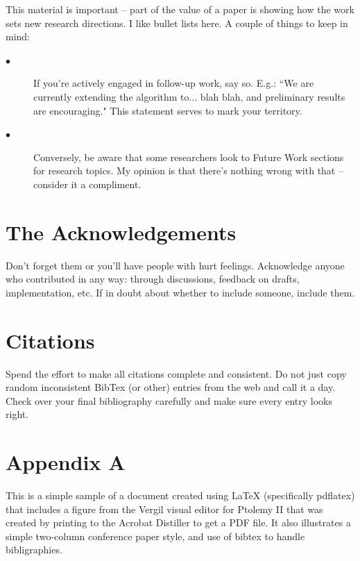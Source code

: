 \documentclass[10pt,twocolumn]{article}
\begin{document}
This material is important -- part of the value of a paper is showing how the work sets new research directions. I like bullet lists here. A couple of things to keep in mind:
\begin{description}
  \item[$\bullet$]  If you're actively engaged in follow-up work, say so. E.g.: ``We are currently extending the algorithm to... blah blah, and preliminary results are encouraging." This statement serves to mark your territory.
\item[$\bullet$]  Conversely, be aware that some researchers look to Future Work sections for research topics. My opinion is that there's nothing wrong with that -- consider it a compliment.
\end{description}

\section{The Acknowledgements}

Don't forget them or you'll have people with hurt feelings. Acknowledge anyone who contributed in any way: through discussions, feedback on drafts, implementation, etc. If in doubt about whether to include someone, include them.


\section{Citations}

Spend the effort to make all citations complete and consistent. Do not just copy random inconsistent BibTex (or other) entries from the web and call it a day. Check over your final bibliography carefully and make sure every entry looks right.

\section{Appendix A}
This is a simple sample of a document created using \LaTeX
   (specifically pdflatex) that includes a figure from the Vergil visual editor for Ptolemy II
   that was created by printing to the Acrobat Distiller to get a PDF file.
   It also illustrates a simple two-column conference paper style,
   and use of bibtex to handle bibligraphies.
\end{document}
